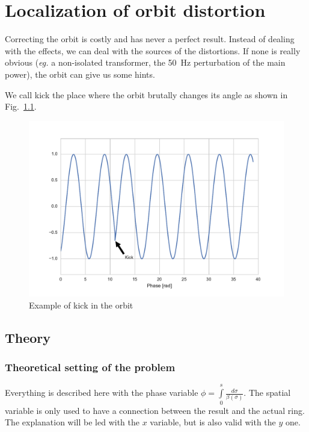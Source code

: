 
\chapter{Localization of orbit distortion}
\label{sec:localisation}

Correcting the orbit is costly and has never a perfect result. Instead of dealing with the effects, we can deal with the sources of the distortions. If none is really obvious (\textit{eg.} a non-isolated transformer, the 50~Hz perturbation of the main power), the orbit can give us some hints.

We call kick the place where the orbit brutally changes its angle as shown in Fig.~\ref{fig:kick}.

\begin{figure}[!h]
	\centering
	\includegraphics[width=.9\linewidth]{img/kick}
	\caption{\label{fig:kick}Example of kick in the orbit}
\end{figure}

\section{Theory}
\label{ssec:loc_theory}

\subsection{Theoretical setting of the problem}

Everything is described here with the phase variable $\phi = \int\limits_{0}^s \frac{d\sigma}{\beta(\sigma)}$. The spatial variable is only used to have a connection between the result and the actual ring. The explanation will be led with the $x$ variable, but is also valid with the $y$ one.

